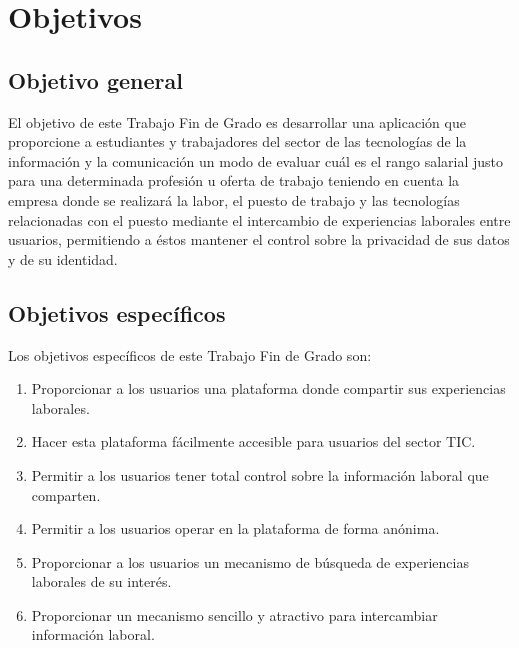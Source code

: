 \documentclass[a4paper, 12pt]{book}
\begin{document}

    \cleardoublepage %


    \chapter{Objetivos} %
    \label{chap:targets} %


    \section{Objetivo general} %
    \label{sec:targets_generaltarget} %

    El objetivo de este Trabajo Fin de Grado es desarrollar una aplicación que proporcione a estudiantes y trabajadores
    del sector de las tecnologías de la información y la comunicación un modo de evaluar cuál es el rango salarial justo
    para una determinada profesión u oferta de trabajo teniendo en cuenta la empresa donde se realizará la labor,
    el puesto de trabajo y las tecnologías relacionadas con el puesto mediante el intercambio de experiencias laborales
    entre usuarios, permitiendo a éstos mantener el control sobre la privacidad de sus datos y de su identidad.


    \section{Objetivos específicos}
    \label{sec:target_specifictargets}

    Los objetivos específicos de este Trabajo Fin de Grado son:

    \begin{enumerate}
        \item Proporcionar a los usuarios una plataforma donde compartir sus experiencias laborales.
        \item Hacer esta plataforma fácilmente accesible para usuarios del sector TIC.
        \item Permitir a los usuarios tener total control sobre la información laboral que comparten.
        \item Permitir a los usuarios operar en la plataforma de forma anónima.
        \item Proporcionar a los usuarios un mecanismo de búsqueda de experiencias laborales de su interés.
        \item Proporcionar un mecanismo sencillo y atractivo para intercambiar información laboral.
    \end{enumerate}
\end{document}
